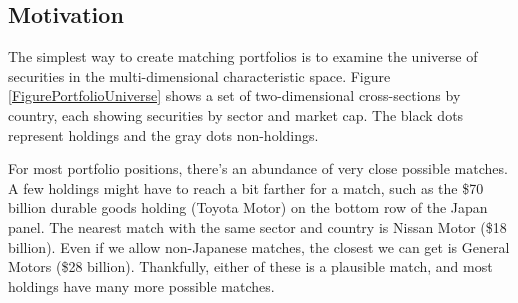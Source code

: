 \documentclass{article}\usepackage{graphicx, color}
\begin{document}
\subsection{Motivation}

The simplest way to create matching portfolios is to examine the
universe of securities in the multi-dimensional characteristic
space. Figure \ref{FigurePortfolioUniverse} shows a set of
two-dimensional cross-sections by country, each showing securities by
sector and market cap. The black dots represent holdings and the gray
dots non-holdings.

For most portfolio positions, there's an abundance of very close
possible matches. A few holdings might have to reach a bit farther for
a match, such as the \$70 billion durable goods holding (Toyota Motor) on the
bottom row of the Japan panel. The nearest match with the same sector
and country is Nissan Motor (\$18 billion). Even if we allow
non-Japanese matches, the closest we can get is General Motors (\$28
billion). Thankfully, either of these is a plausible match, and most
holdings have many more possible matches.
\end{document}
